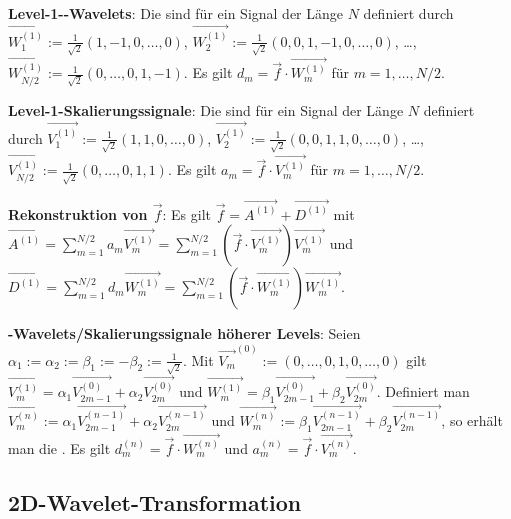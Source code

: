 \linie

\textbf{Level-1--Wavelets}:
Die  sind für ein Signal der Länge $N$ definiert durch
$\vec{W_1^{(1)}} := \frac{1}{\sqrt{2}} (1, -1, 0, \dotsc, 0)$,
$\vec{W_2^{(1)}} := \frac{1}{\sqrt{2}} (0, 0, 1, -1, 0, \dotsc, 0)$,
\dots,\\
$\vec{W_{N/2}^{(1)}} := \frac{1}{\sqrt{2}} (0, \dotsc, 0, 1, -1)$.
Es gilt $d_m = \vec{f} \cdot \vec{W_m^{(1)}}$ für $m = 1, \dotsc, N/2$.

\textbf{Level-1-Skalierungssignale}:
Die  sind für ein Signal der Länge $N$ definiert durch
$\vec{V_1^{(1)}} := \frac{1}{\sqrt{2}} (1, 1, 0, \dotsc, 0)$,
$\vec{V_2^{(1)}} := \frac{1}{\sqrt{2}} (0, 0, 1, 1, 0, \dotsc, 0)$,
\dots,\\
$\vec{V_{N/2}^{(1)}} := \frac{1}{\sqrt{2}} (0, \dotsc, 0, 1, 1)$.
Es gilt $a_m = \vec{f} \cdot \vec{V_m^{(1)}}$ für $m = 1, \dotsc, N/2$.

\textbf{Rekonstruktion von $\vec{f}$}:
Es gilt $\vec{f} = \vec{A^{(1)}} + \vec{D^{(1)}}$ mit\\
$\vec{A^{(1)}} = \sum_{m=1}^{N/2} a_m \vec{V_m^{(1)}}
= \sum_{m=1}^{N/2} (\vec{f} \cdot \vec{V_m^{(1)}}) \vec{V_m^{(1)}}$ und
$\vec{D^{(1)}} = \sum_{m=1}^{N/2} d_m \vec{W_m^{(1)}}
= \sum_{m=1}^{N/2} (\vec{f} \cdot \vec{W_m^{(1)}}) \vec{W_m^{(1)}}$.

\linie

\textbf{-Wavelets/Skalierungssignale höherer Levels}:
Seien $\alpha_1 := \alpha_2 := \beta_1 := -\beta_2 := \frac{1}{\sqrt{2}}$.
Mit $\vec{V_m}^{(0)} := (0, \dotsc, 0, 1, 0, \dotsc, 0)$ gilt
$\vec{V_m^{(1)}} = \alpha_1 \vec{V_{2m-1}^{(0)}} + \alpha_2 \vec{V_{2m}^{(0)}}$ und
$\vec{W_m^{(1)}} = \beta_1 \vec{V_{2m-1}^{(0)}} + \beta_2 \vec{V_{2m}^{(0)}}$.
Definiert man
$\vec{V_m^{(n)}} := \alpha_1 \vec{V_{2m-1}^{(n-1)}} + \alpha_2 \vec{V_{2m}^{(n-1)}}$ und
$\vec{W_m^{(n)}} := \beta_1 \vec{V_{2m-1}^{(n-1)}} + \beta_2 \vec{V_{2m}^{(n-1)}}$,
so erhält man die .
Es gilt $d_m^{(n)} = \vec{f} \cdot \vec{W_m^{(n)}}$ und
$a_m^{(n)} = \vec{f} \cdot \vec{V_m^{(n)}}$.

\pagebreak

\subsection{%
    2D-Wavelet-Transformation%
}


